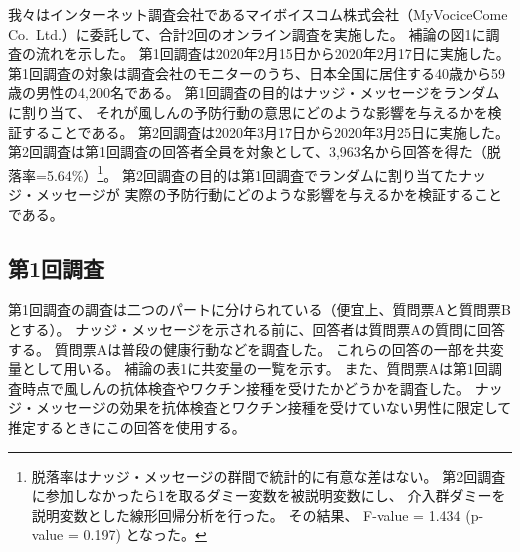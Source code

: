 \documentclass[
  11pt,
  a4paper,
]{article}
\begin{document}
我々はインターネット調査会社であるマイボイスコム株式会社（MyVociceCome Co.~Ltd.）に委託して、合計2回のオンライン調査を実施した。
補論の図1に調査の流れを示した。
第1回調査は2020年2月15日から2020年2月17日に実施した。
第1回調査の対象は調査会社のモニターのうち、日本全国に居住する40歳から59歳の男性の4,200名である。
第1回調査の目的はナッジ・メッセージをランダムに割り当て、
それが風しんの予防行動の意思にどのような影響を与えるかを検証することである。
第2回調査は2020年3月17日から2020年3月25日に実施した。
第2回調査は第1回調査の回答者全員を対象として、3,963名から回答を得た（脱落率=5.64\%）\footnote{脱落率はナッジ・メッセージの群間で統計的に有意な差はない。
  第2回調査に参加しなかったら1を取るダミー変数を被説明変数にし、
  介入群ダミーを説明変数とした線形回帰分析を行った。
  その結果、
  F-value = 1.434 (p-value = 0.197)
  となった。}。
第2回調査の目的は第1回調査でランダムに割り当てたナッジ・メッセージが
実際の予防行動にどのような影響を与えるかを検証することである。

\hypertarget{wave1}{%
\subsection{第1回調査}\label{wave1}}

第1回調査の調査は二つのパートに分けられている（便宜上、質問票Aと質問票Bとする）。
ナッジ・メッセージを示される前に、回答者は質問票Aの質問に回答する。
質問票Aは普段の健康行動などを調査した。
これらの回答の一部を共変量として用いる。
補論の表1に共変量の一覧を示す。
また、質問票Aは第1回調査時点で風しんの抗体検査やワクチン接種を受けたかどうかを調査した。
ナッジ・メッセージの効果を抗体検査とワクチン接種を受けていない男性に限定して推定するときにこの回答を使用する。
\end{document}
